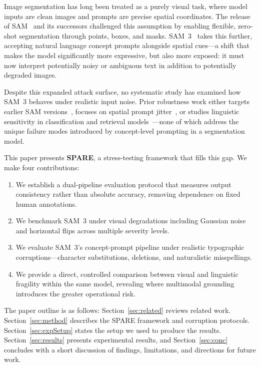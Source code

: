 \documentclass[10pt,twocolumn,letterpaper]{article}
\begin{document}
Image segmentation has long been treated as a purely visual task, where model inputs are
clean images and prompts are precise spatial coordinates. The release of SAM~\cite{kirillov2023sam}
and its successors challenged this assumption by enabling flexible, zero-shot segmentation 
through points, boxes, and masks. SAM~3~\cite{peng2025sam3} takes this further, accepting 
natural language concept prompts alongside spatial cues—a shift that makes the model 
significantly more expressive, but also more exposed: it must now interpret potentially 
noisy or ambiguous text in addition to potentially degraded images.

Despite this expanded attack surface, no systematic study has examined how SAM~3 behaves 
under realistic input noise. Prior robustness work either targets earlier SAM 
versions~\cite{wang2023empirical,chen2024robustsam}, focuses on spatial prompt 
jitter~\cite{moskalenko2026breps}, or studies linguistic sensitivity in classification and 
retrieval models~\cite{materzynska2025scam,schmalfuss2025parc}—none of which address the 
unique failure modes introduced by concept-level prompting in a segmentation model.

This paper presents \textbf{SPARE}, a stress-testing framework that fills this gap. 
We make four contributions:
\begin{enumerate}
    \item We establish a dual-pipeline evaluation protocol that measures output consistency 
    rather than absolute accuracy, removing dependence on fixed human annotations.
    \item We benchmark SAM~3 under visual degradations including Gaussian noise and 
    horizontal flips across multiple severity levels.
    \item We evaluate SAM~3's concept-prompt pipeline under realistic typographic 
    corruptions—character substitutions, deletions, and naturalistic misspellings.
    \item We provide a direct, controlled comparison between visual and linguistic 
    fragility within the same model, revealing where multimodal grounding introduces 
    the greater operational risk.
\end{enumerate}

The paper outline is as follows: Section~\ref{sec:related} reviews 
related work. Section~\ref{sec:method} describes the SPARE framework and corruption 
protocols. Section~\ref{sec:expSetup} states the setup we used to produce the results.  Section~\ref{sec:results} presents experimental results, and 
Section~\ref{sec:conc} concludes with a short discussion of findings, limitations, and 
directions for future work.
\end{document}
